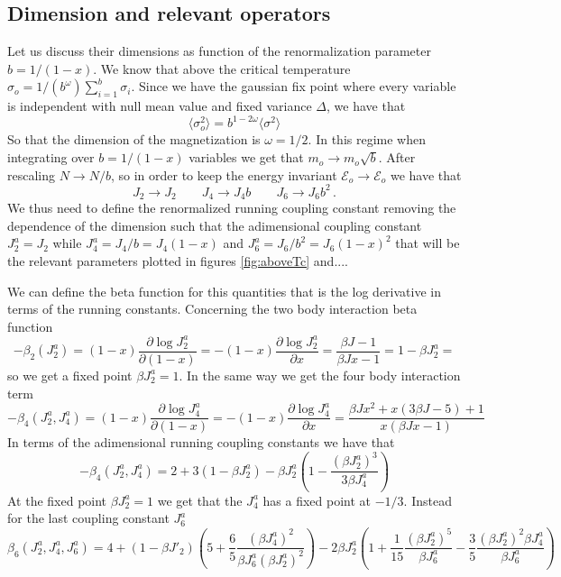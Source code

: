 \documentclass[aps,pre,noshowpacs]{revtex4}
\begin{document}
\subsection{Dimension and relevant operators}

Let us discuss their dimensions as function of the renormalization parameter $b=1/(1-x)$. We know that above the critical temperature $\sigma_o=1/(b^{\omega}) \sum_{i=1}^{b} \sigma_i $. Since we have the gaussian fix point  where every variable is independent with null mean value and fixed variance $\Delta$, we have that $$\langle \sigma_o^2\rangle = b^{1-2 \omega} \langle \sigma^2\rangle $$ So that the dimension of the magnetization is $\omega=1/2$. In this regime when integrating over $b=1/(1-x)$ variables we get that $m_o \to m_o \sqrt{b}$. After rescaling $N \to N /b$, so in order to keep the energy invariant $\mathcal{E}_o \to \mathcal{E}_o$ we have that
$$J_2 \to J_2  \qquad J_4 \to  J_4 b \qquad J_6 \to J_6 b^2\,.$$
We thus need to define the renormalized running coupling constant removing the dependence of the dimension such that the adimensional coupling constant $J^a_2=J_2$ while $J^a_4=J_4 / b=J_4 (1-x) $ and $J^a_6=J_6 /b^2=J_6(1-x)^2$ that will be the relevant parameters plotted in figures \ref{fig:aboveTc} and.... 


We can define the beta function for this quantities that is the log derivative in terms of the running constants. Concerning the two body interaction beta function
\begin{equation}
-\beta_2(J^a_2) = (1-x) \frac{\partial \log J^a_2}{\partial (1-x)} =-(1-x) \frac{\partial \log J^a_2}{\partial x} = \frac{\beta J -1}{\beta J x -1} = 1-\beta J^a_2 =
\end{equation}
so we get a fixed point $\beta J^a_2=1$. In the same way we get the four body interaction term
\begin{equation}
-\beta_4(J^a_2, J^a_4) = (1-x) \frac{\partial \log J^a_4}{\partial (1-x)} =-(1-x) \frac{\partial \log J^a_4}{\partial x} = \frac{\beta  J x^2+x (3 \beta  J-5)+1}{x (\beta  J x-1)}
\end{equation}
In terms of the adimensional running coupling constants we have that 
\begin{equation}
-\beta_4(J^a_2, J^a_4)  =   2 + 3(1-\beta J^a_2) - \beta J^a_2\left(1-\frac{(\beta J^a_2)^3}{3\beta J^a_4} \right)
\end{equation}
At the fixed point $\beta J^a_2=1$ we get that the $J^a_4$ has a fixed point at $-1/3$. 
Instead for the last coupling constant $J^a_6$ 
\begin{equation}
\beta_6(J^a_2, J^a_4,J^a_6) = 4+ (1-\beta J'_2) \left(5 + \frac{6}{5} \frac{(\beta J^a_4)^2}{\beta J^a_6 (\beta J^a_2)^2}\right)- 2\beta J^a_2 \left( 1+ \frac{1}{15} \frac{(\beta J^a_2)^5}{ \beta J^a_6} - \frac{3}{5}  \frac{(\beta J^a_2)^2 \beta J^a_4}{\beta J^a_6}\right) 
\end{equation}
\end{document}
